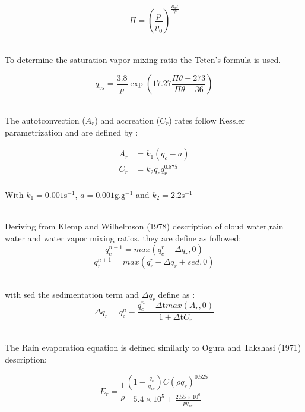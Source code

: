 \documentclass[times,doublespace]{fldauth}
\begin{document}
\begin{equation}
\Pi=\left(\frac{p}{p_0}\right)^{\frac{R_dT}{cp}}
\end{equation}


~\\To determine the saturation vapor mixing ratio the Teten's formula is used.

\begin{equation}
q_{vs}=\frac{3.8}{p}\exp\left(17.27\frac{\Pi \theta-273}{\Pi \theta-36}\right)
\end {equation}



~\\The autotconvection ($A_r$) and accreation ($C_r$) rates follow Kessler parametrization and are defined by :

\begin{equation}
\begin{split}
A_r&=k_1(q_c-a) \\
C_r&=k_2q_cq_r^{0.875}
\end{split}
\end{equation}
~\\ With $k_1=0.001 \text{s}^{-1}$, $a=0.001 \text{g}.\text{g}^{-1}$ and $k_2=2.2 \text{s}^{-1}$ 

~\\ Deriving from Klemp and Wilhelmson (1978) description of cloud water,rain water and water vapor mixing ratios. they are define as followed:
\begin{equation}
q_c^{n+1}=max(q_c^r-\Delta q_r,0)
\end{equation}
\begin{equation}
q_r^{n+1}=max(q_r^r-\Delta q_r+sed,0)
\end{equation}

~\\with sed the sedimentation term and $\Delta q_r$ define as :
\begin{equation}
\Delta q_r=q_c^n-\frac{q_c^n-\Delta \text{t} max(A_r,0)}{1+\Delta \text{t} C_r}
\end{equation}






~\\ The Rain evaporation equation is defined similarly to Ogura and Takshasi (1971) description:

\begin{equation}
E_r=\frac{1}{\rho}\frac{\left(1-\frac{q_v}{q_{vs}}\right)C(\rho q_r)^{0.525}}{5.4\times10^5+\frac{2.55\times10^6}{pq_{vs}}}
\end{equation}
\end{document}
